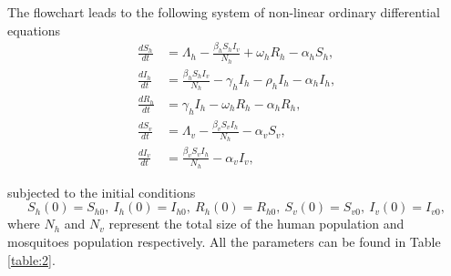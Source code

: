 \documentclass[review]{elsarticle}
\begin{document}
The flowchart leads to the following system of non-linear ordinary differential equations
\begin{equation}\label{model1}
\begin{aligned}
  \frac{dS_h}{dt} &=\Lambda_h - \frac{\beta_h S_hI_v}{N_h}+\omega_h R_h-\alpha_h S_h, \\
  \frac{dI_h}{dt} &= \frac{\beta_h S_hI_v}{N_h}-\gamma_h I_h -\rho_h I_h-\alpha_h I_h,  \\
  \frac{dR_h}{dt} &=  \gamma_h I_h-\omega_h R_h-\alpha_h R_h, \\
  \frac{dS_v}{dt} &=  \Lambda_v-\frac{\beta_v S_vI_h}{N_h}-\alpha_v S_v, \\
  \frac{dI_v}{dt} &=  \frac{\beta_v S_vI_h}{N_h}-\alpha_v I_v,
\end{aligned}
\end{equation}

subjected to the initial conditions
\[
S_h(0)=S_{h0},\ I_h(0)=I_{h0},\ R_h(0)=R_{h0},\ S_v(0)=S_{v0},\ I_v(0)=I_{v0},
\]
where $N_h$ and $N_v$ represent the total size of the human population and mosquitoes population respectively. All the parameters can be found in Table \ref{table:2}.
\end{document}
